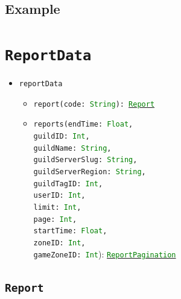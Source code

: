 \documentclass[10pt, a4paper]{memoir}
\numberwithin{equation}{section}
\theoremstyle{plain}
\theoremstyle{defp}
\theoremstyle{dotless}
\theoremstyle{definition}
\theoremstyle{dotless}
\theoremstyle{dotless}
\theoremstyle{defp}
\theoremstyle{defp}
\theoremstyle{be}          %
\theoremstyle{defp}
\newcommand\ttt[1]{\texttt{#1}}
\newcommand\type[1]{\ttt{\textcolor{green}{#1}}}
\begin{document}
\subsection{Example}

\newpage




\section{\ttt{ReportData}}\label{sec:ReportData}

\begin{itemize} [noitemsep,topsep=1pt]
\item \ttt{reportData}
	\begin{itemize}[noitemsep,topsep=1pt]
		\item \ttt{report(code: \type{String}): \hyperref[sec:Report]{\type{Report}}}
		\item \ttt{reports(endTime: \type{Float}, \\guildID: \type{Int}, \\guildName: \type{String}, \\guildServerSlug: \type{String}, \\guildServerRegion: \type{String}, \\guildTagID: \type{Int}, \\userID: \type{Int}, \\limit: \type{Int}, \\page: \type{Int}, \\startTime: \type{Float}, \\zoneID: \type{Int}, \\gameZoneID: \type{Int}}): \hyperref[sec:reportpagination]{\type{ReportPagination}}
	\end{itemize}
\end{itemize}

\subsection{\ttt{Report}}\label{sec:Report}
\end{document}
